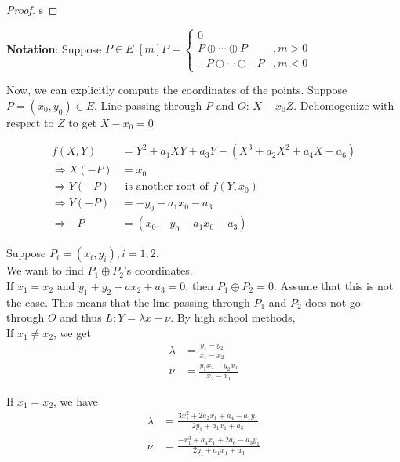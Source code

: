 \documentclass[oneside, 12pt]{scrbook}
\theoremstyle{theorem}
\begin{document}
\begin{proof}
s
\end{proof}

\textbf{Notation}: Suppose $P \in E$
$ [m]P = \begin{cases}
0 & \\
P \oplus \cdots \oplus P &, m>0 \\
-P \oplus \cdots \oplus -P &, m<0
\end{cases} $

Now, we can explicitly compute the coordinates of the points. Suppose $P = (x_{0},y_{0}) \in E$. Line passing through $P$ and $O$: $X-x_{0}Z$. Dehomogenize with respect to $Z$ to get $X-x_{0}=0$

\begin{align*}
f(X,Y) &= Y^2 + a_{1}XY + a_{3}Y - (X^3 + a_{2}X^2 + a_{4}X - a_{6})\\
\Rightarrow X(-P) &= x_{0}\\
\Rightarrow Y(-P) &\text{ is another root of } f(Y,x_{0}) \\
\Rightarrow Y(-P) &= -y_{0} - a_{1}x_{0} -a_{3} \\
\Rightarrow -P &= (x_{0}, -y_{0}-a_{1}x_{0} - a_{3}) 
\end{align*}

Suppose $P_{i} = (x_{i},y_{i}), i=1,2$. \\

We want to find $P_{1} \oplus P_{2}$'s coordinates. \\

If $x_{1}=x_{2}$ and $y_{1} + y_{2} + ax_{2} + a_{3}=0$, then $P_{1} \oplus P_{2} = 0$. Assume that this is not the case. This means that the line passing through $P_{1}$ and $P_{2}$ does not go through $O$ and thus $L: Y = \lambda x + \nu$. By high school methods, \\

If $x_{1}\neq x_{2}$, we get 
\begin{align*}
\lambda &= \frac{y_{1}-y_{2}}{x_{1}-x_{2}} \\
\nu &= \frac{y_{1}x_{2} - y_{2}x_{1}}{x_{2}-x_{1}} 
\end{align*}

If $x_{1} = x_{2}$, we have 
\begin{align*}
\lambda &= \frac{3x_{1}^2 + 2a_{2}x_{1} + a_{4} - a_{1}y_{1}}{2y_{1} + a_{1}x_{1} + a_{3}} \\
\nu &= \frac{-x_{1}^3 + a_{4}x_{1} +2a_{6} -a_{3}y_{1}}{2y_{1} + a_{1}x_{1} + a_{3}}
\end{align*}
\end{document}

